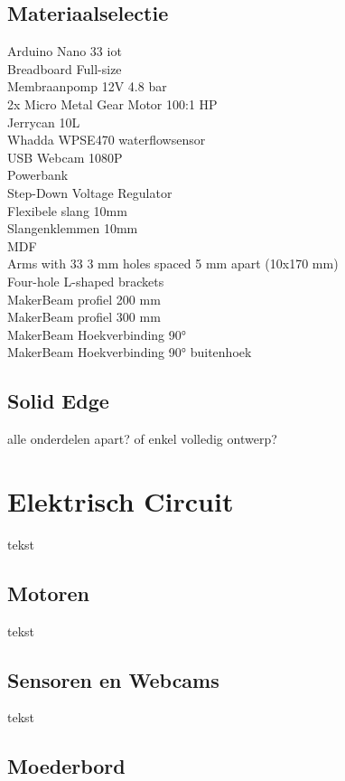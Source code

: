 \documentclass[kulak]{kulakarticle} %
\begin{document}
	\subsection{Materiaalselectie}
	Arduino Nano 33 iot \\
	Breadboard Full-size \\
	Membraanpomp 12V 4.8 bar \\
	2x Micro Metal Gear Motor 100:1 HP \\
	Jerrycan 10L\\
	Whadda WPSE470 waterflowsensor \\
	USB Webcam 1080P \\
	Powerbank\\
	Step-Down Voltage Regulator \\
	Flexibele slang 10mm \\
	Slangenklemmen 10mm \\
	MDF \\
	Arms with 33 3 mm holes spaced 5 mm apart (10x170 mm) \\
	Four-hole L-shaped brackets \\
	MakerBeam profiel 200 mm \\
	MakerBeam profiel 300 mm \\
	MakerBeam Hoekverbinding 90° \\
	MakerBeam Hoekverbinding 90° buitenhoek \\
	
	
	\subsection{Solid Edge}
	alle onderdelen apart? of enkel volledig ontwerp?
	
	
	\section{Elektrisch Circuit}
	
	tekst
	
	
	\subsection{Motoren}
	
	tekst
	
	
	\subsection{Sensoren en Webcams}
	
	tekst
	
	
	\subsection{Moederbord}
	
\end{document}
